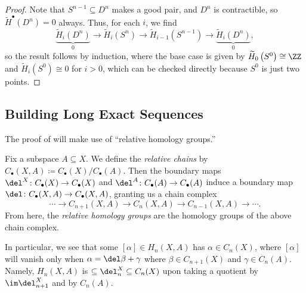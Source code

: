 \documentclass[../notes.tex]{subfiles}
\begin{document}
\begin{proof}
	Note that $S^{n-1}\subseteq D^n$ makes a good pair, and $D^n$ is contractible, so $\widetilde H^\bullet\left(D^n\right)=0$ always. Thus, for each $i$, we find
	\[\underbrace{\widetilde H_i\left(D^n\right)}_0\to\widetilde H_i\left(S^n\right)\to\widetilde H_{i-1}\left(S^{n-1}\right)\to\underbrace{\widetilde H_i\left(D^n\right)}_0,\]
	so the result follows by induction, where the base case is given by $\widetilde H_0\left(S^0\right)\cong\ZZ$ and $\widetilde H_i\left(S^0\right)\cong0$ for $i>0$, which can be checked directly because $S^0$ is just two points.
\end{proof}

\subsection{Building Long Exact Sequences}
The proof of  will make use of ``relative homology groups.''
\begin{definition}
	Fix a subspace $A\subseteq X$. We define the \textit{relative chains} by $C_\bullet(X,A)\coloneqq C_\bullet(X)/C_\bullet(A)$. Then the boundary maps $\del^X\colon C_\bullet(X)\to C_\bullet(X)$ and $\del^A\colon C_\bullet(A)\to C_\bullet(A)$ induce a boundary map $\del\colon C_\bullet(X,A)\to C_\bullet(X,A)$, granting us a chain complex
	\[\cdots\to C_{n+1}(X,A)\to C_n(X,A)\to C_{n-1}(X,A)\to\cdots.\]
	From here, the \textit{relative homology groups} are the homology groups of the above chain complex.
\end{definition}
In particular, we see that some $[\alpha]\in H_n(X,A)$ has $\alpha\in C_n(X)$, where $[\alpha]$ will vanish only when $\alpha=\del\beta+\gamma$ where $\beta\in C_{n+1}(X)$ and $\gamma\in C_n(A)$. Namely, $H_n(X,A)$ is $\subseteq\del^X_n\subseteq C_n(X)$ upon taking a quotient by $\im\del_{n+1}^X$ and by $C_n(A)$.
\end{document}
